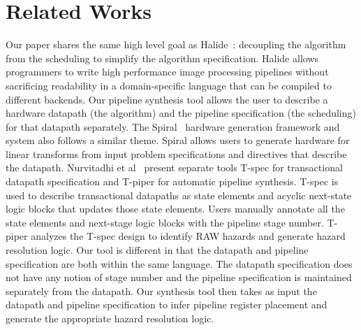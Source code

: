 \section{Related Works}
\label{sec:related-work}

Our paper shares the same high level goal as
Halide~\cite{halide:siggraph}: decoupling the algorithm from the
scheduling to simplify the algorithm specification. Halide allows
programmers to write high performance image processing pipelines
without sacrificing readability in a domain-specific language that can
be compiled to different backends. Our pipeline synthesis tool allows
the user to describe a hardware datapath (the algorithm) and the pipeline
specification (the scheduling) for that datapath separately. The
Spiral~\cite{hoe:spiral} hardware generation framework and system
also follows a similar theme. Spiral allows users to generate hardware
for linear transforms from input problem specifications and directives
that describe the datapath. Nurvitadhi et al~\cite{hoe:syn} present
separate tools T-spec for transactional datapath specification and
T-piper for automatic pipeline synthesis. T-spec is used to describe
transactional datapaths as state elements and acyclic next-state logic
blocks that updates those state elements. Users manually annotate all
the state elements and next-stage logic blocks with the pipeline
stage number. T-piper analyzes the T-spec design to identify RAW
hazards and generate hazard resolution logic. Our tool is
different in that the datapath and pipeline specification are both
within the same language. The datapath specification does not have any
notion of stage number and the pipeline specification is maintained
separately from the datapath. Our synthesis tool then takes as input
the datapath and pipeline specification to infer pipeline register
placement and generate the appropriate hazard resolution logic.

